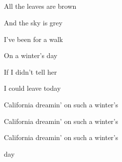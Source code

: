 \begin{song}
\bigskip

  \textbar\   \par
{}    \textbar\   \par
{}    \textbar\   \par
{}    \textbar\   \par

\bigskip

All the leaves are brown   \par
And the sky is grey  \par
I've been for a walk   \par
On a winter's day  \par
If I didn’t tell her   \par
I could leave today  \par

\bigskip

California dreamin’   on such a winter's \par
{} California dreamin’   on such a winter's \par
{} California dreamin’   on such a winter's \par
{} day \par
{} \par

\end{song}
